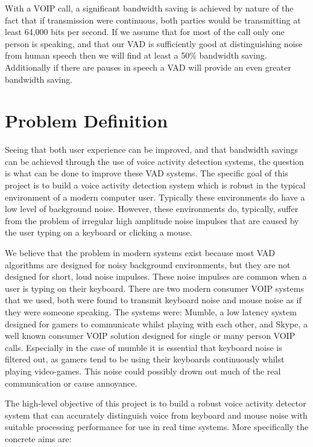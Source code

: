 \documentclass[ %
                    author={Sam Phippen},
                supervisor={Dr. Rafal Bogacz},
                     title={Real time voice activity detectors in noisy personal computing environments},
                  subtitle={},
                    degree={MEng},
                      year={2012} ]{thesis}
\begin{document}
With a VOIP call, a significant bandwidth saving is achieved by nature of the
fact that if transmission were continuous, both parties would be transmitting
at least 64,000 bits per second\cite{ciscovad}. If we assume that for most of
the call only one person is speaking, and that our VAD is sufficiently good at
distinguishing noise from human speech then we will find at least a 50\%
bandwidth saving. Additionally if there are pauses in speech a VAD will
provide an even greater bandwidth saving.


\section{Problem Definition}

Seeing that both user experience can be improved, and that bandwidth savings
can be achieved through the use of voice activity detection systems, the
question is what can be done to improve these VAD systems. The specific goal of
this project is to build a voice activity detection system which is robust in
the typical environment of a modern computer user. Typically these environments
do have a low level of background noise. However, these environments do,
typically, suffer from the problem of irregular high amplitude noise impulses
that are caused by the user typing on a keyboard or clicking a mouse.

We believe that the problem in modern systems exist because most VAD algorithms
are designed for noisy background environments\cite{shin}, but they are not
designed for short, loud noise impulses. These noise impulses are common when a
user is typing on their keyboard. There are two modern consumer VOIP systems
that we used, both were found to transmit keyboard noise and mouse noise  as if
they were someone speaking. The systems were: Mumble\cite{mumble}, a low
latency system designed for gamers to communicate whilst playing with each
other, and Skype\texttrademark\cite{skype}, a well known consumer VOIP solution
designed for single or many person VOIP calls.  Especially in the case of
mumble it is essential that keyboard noise is filtered out, as gamers tend to
be using their keyboards continuously whilst playing video-games. This noise
could possibly drown out much of the real communication or cause annoyance.

The high-level objective of this project is to build a robust voice activity
detector system that can accurately distinguish voice from keyboard and mouse
noise with suitable processing performance for use in real time systems. More
specifically the concrete aims are:
\end{document}
